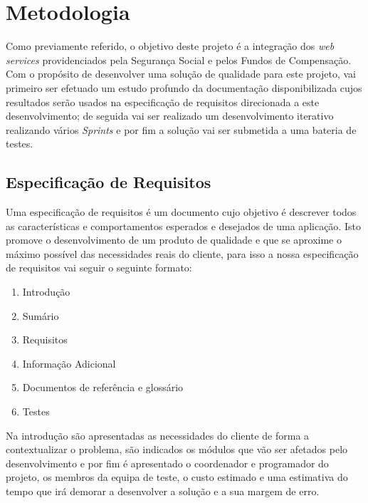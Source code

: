 \documentclass[sigplan]{acmart}
\begin{document}
\section{Metodologia} \label{sec:methods}

Como previamente referido, o objetivo deste projeto é a integração dos \textit{web services} providenciados pela Segurança Social e pelos Fundos de Compensação. Com o propósito de desenvolver uma solução de qualidade para este projeto, vai primeiro ser efetuado um estudo profundo da documentação disponibilizada cujos resultados serão usados na especificação de requisitos direcionada a este desenvolvimento; de seguida vai ser realizado um desenvolvimento iterativo realizando vários \textit{Sprints} e por fim a solução vai ser submetida a uma bateria de testes.

\subsection{Especificação de Requisitos}

Uma especificação de requisitos é um documento cujo objetivo é descrever todos as características e comportamentos esperados e desejados de uma aplicação\cite{SRS}. Isto promove o desenvolvimento de um produto de qualidade e que se aproxime o máximo possível das necessidades reais do cliente, para isso a nossa especificação de requisitos vai seguir o seguinte formato:
\begin{enumerate}
  \item Introdução
  \item Sumário
  \item Requisitos
  \item Informação Adicional
  \item Documentos de referência e glossário
  \item Testes
\end{enumerate}
Na introdução são apresentadas as necessidades do cliente de forma a contextualizar o problema, são indicados os módulos que vão ser afetados pelo desenvolvimento e por fim é apresentado o coordenador e programador do projeto, os membros da equipa de teste, o custo estimado e uma estimativa do tempo que irá demorar a desenvolver a solução e a sua margem de erro.
\end{document}

